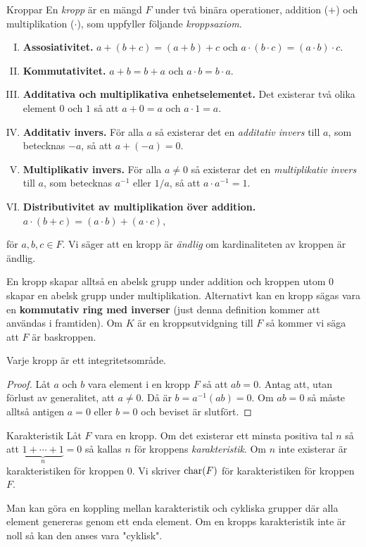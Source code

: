 \documentclass{article}
\newcommand{\kar}[0]{\textnormal{char}}
\theoremstyle{definition}
\begin{document}
\begin{mydef}{Kroppar}{}
    En \textit{kropp} är en mängd $F$ under två binära operationer, addition ($+$) och multiplikation ($\cdot$), som uppfyller följande \textit{kroppsaxiom}.
    \begin{enumerate}[I)]
        \item \textbf{Assosiativitet.} $a + (b + c) = (a + b) + c$ och $a \cdot (b \cdot c) = (a \cdot b) \cdot c$.
        \item \textbf{Kommutativitet.} $a + b = b + a$ och $a \cdot b = b \cdot a$.
        \item \textbf{Additativa och multiplikativa enhetselementet.} Det existerar två olika element $0$ och $1$ så att $a + 0 = a$ och $a \cdot 1 = a.$
        \item \textbf{Additativ invers.} För alla $a$ så existerar det en \textit{additativ invers} till $a$, som betecknas
        $-a$, så att $a + (-a) = 0$.
        \item \textbf{Multiplikativ invers.} För alla $a \neq 0$ så existerar det en \textit{multiplikativ invers} till $a$, som betecknas $a^{-1}$ eller $1/a$, så att 
        $a \cdot a^{-1} = 1.$
        \item \textbf{Distributivitet av multiplikation över addition.} $a \cdot (b + c) = (a \cdot b) + (a \cdot c)$,
    \end{enumerate}
    för $a, b, c \in F.$ Vi säger att en kropp är \textit{ändlig} om kardinaliteten av kroppen är ändlig.
\end{mydef}
En kropp skapar alltså en abelsk grupp under addition och kroppen utom $0$ skapar en abelsk grupp under multiplikation. Alternativt kan en kropp sägas
vara en \textbf{kommutativ ring med inverser} (just denna definition kommer att användas i framtiden). 
Om $K$ är en kroppsutvidgning till $F$ så kommer vi säga att $F$ är baskroppen. 

\begin{myprop}{}{}
  Varje kropp är ett integritetsområde.
\end{myprop}

\begin{proof}
  Låt $a$ och $b$ vara element i en kropp $F$ så att $ab = 0$. Antag att, utan förlust av generalitet, att $a \neq 0.$ 
  Då är $b = a^{-1}(ab) = 0$. Om $ab = 0$ så måste alltså antigen $a = 0$ eller $b = 0$ och beviset är slutfört.
\end{proof}

\begin{mydef}{Karakteristik}{}
  Låt $F$ vara en kropp. Om det existerar ett minsta positiva tal $n$ så att $\underbrace{1 + \cdots + 1}_{n} = 0$ så kallas $n$ för kroppens \textit{karakteristik}.
  Om $n$ inte existerar är karakteristiken för kroppen $0.$ Vi skriver $\kar(F)$ för karakteristiken för kroppen $F$.
\end{mydef}
Man kan göra en koppling mellan karakteristik och cykliska grupper där alla element genereras genom ett enda element. Om en kropps karakteristik inte är noll
så kan den anses vara "cyklisk". 
\end{document}
